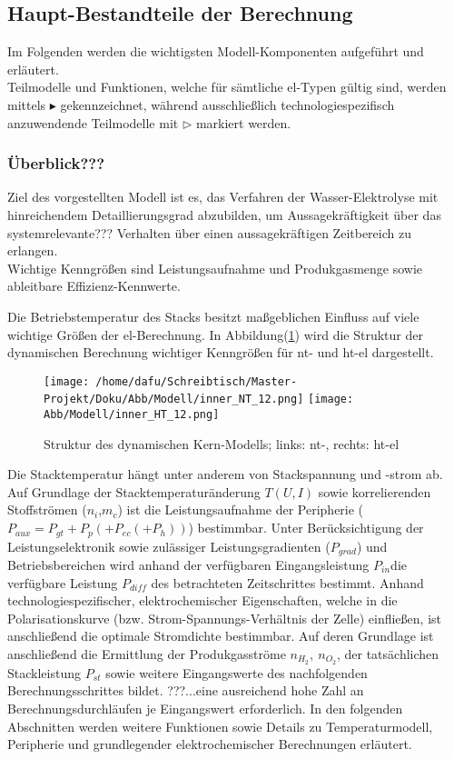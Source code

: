 \documentclass[onecolumn,10pt,titlepage]{article}
\begin{document}
\subsection{Haupt-Bestandteile der Berechnung}
Im Folgenden werden die wichtigsten Modell-Komponenten aufgeführt und erläutert.\\
 Teilmodelle und Funktionen, welche für sämtliche \gls{el}-Typen gültig sind, werden mittels $\blacktriangleright$ gekennzeichnet, während ausschließlich technologiespezifisch anzuwendende Teilmodelle mit $\triangleright$ markiert werden.\\
 
\subsubsection{Überblick???}
Ziel des vorgestellten Modell ist es, das Verfahren der Wasser-Elektrolyse mit hinreichendem Detaillierungsgrad abzubilden, um Aussagekräftigkeit über das systemrelevante??? Verhalten über einen aussagekräftigen Zeitbereich zu erlangen.\\ Wichtige Kenngrößen sind Leistungsaufnahme und Produkgasmenge sowie ableitbare Effizienz-Kennwerte.   

Die Betriebstemperatur des Stacks besitzt maßgeblichen Einfluss auf viele wichtige Größen der \gls{el}-Berechnung. 
In Abbildung(\ref{fig:Strukt_Funkt_innerloop}) wird die Struktur der dynamischen Berechnung wichtiger Kenngrößen für \gls{nt}- und \gls{ht}-\gls{el} dargestellt.\\

\begin{figure}[H]
	
	\centering
	\texttt{[image: /home/dafu/Schreibtisch/Master-Projekt/Doku/Abb/Modell/inner\_NT\_12.png]}
	\texttt{[image: Abb/Modell/inner\_HT\_12.png]}
	\caption{Struktur des dynamischen Kern-Modells; links: \gls{nt}-, rechts: \gls{ht}-\gls{el} }
	\label{fig:Strukt_Funkt_innerloop} 
\end{figure}
Die Stacktemperatur hängt unter anderem von Stackspannung und -strom ab.
Auf Grundlage der Stacktemperaturänderung $T(U,I)$ sowie korrelierenden Stoffströmen ($n_{i}$,$m_c$) ist die Leistungsaufnahme der Peripherie ($P_{aux} = P_{gt}+P_{p}(+P_{ec}(+P_{h}))$) bestimmbar. Unter Berücksichtigung der Leistungselektronik sowie zulässiger Leistungsgradienten ($P_{grad}$) und Betriebsbereichen wird anhand der verfügbaren Eingangsleistung $P_{in}$die verfügbare Leistung $P_{diff}$  des betrachteten Zeitschrittes bestimmt. Anhand technologiespezifischer, elektrochemischer Eigenschaften, welche in die Polarisationskurve (bzw. Strom-Spannungs-Verhältnis der Zelle) einfließen, ist anschließend die optimale Stromdichte bestimmbar. Auf deren Grundlage ist anschließend die Ermittlung der Produkgasströme $n_{H_2}, ~n_{O_2}$, der tatsächlichen Stackleistung $P_{st}$ sowie weitere Eingangswerte des nachfolgenden Berechnungsschrittes bildet.  
???...eine ausreichend hohe Zahl an Berechnungsdurchläufen je Eingangswert erforderlich.
In den folgenden Abschnitten werden weitere Funktionen sowie Details zu Temperaturmodell, Peripherie und grundlegender elektrochemischer Berechnungen erläutert.  
\end{document}
